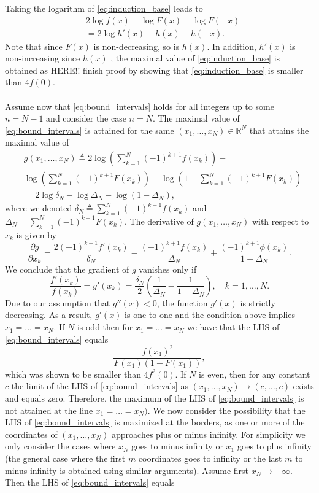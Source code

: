 \documentclass[letterpaper, conference]{IEEEtran}      %
\begin{document}
Taking the logarithm of \eqref{eq:induction_base} leads to 
\begin{align*}
& 2 \log f(x) - \log F(x) - \log F(-x) \\
& = 2 \log h'(x) + h(x) - h(-x).
\end{align*}
Note that since $F(x)$ is non-decreasing, so is $h(x)$. In addition, $h'(x)$ is non-increasing since $h(x)$ 
, the maximal value of \eqref{eq:induction_base} is obtained as 
{HERE!! \color{red} finish proof by showing that \eqref{eq:induction_base} is smaller than $4f(0)$.\\
}
\\
Assume now that \eqref{eq:bound_intervals} holds for all integers up to some $n = N-1$ and consider the case $n = N$. The maximal value of \eqref{eq:bound_intervals} is attained for the same $(x_1,\ldots,x_N) \in \mathbb R^N$ that attains the maximal value of 
\begin{align*}
& g(x_1,\ldots, x_N) \triangleq 2 \log \left(  \sum_{k=1}^{N} (-1)^{k+1} f(x_k) \right) - \\
&  \log
\left( \sum_{k=1}^N (-1)^{k+1} F(x_k) \right)
-\log \left(1 -  \sum_{k=1}^N (-1)^{k+1} F(x_k) \right) \\
& = 2 \log \delta_N - \log \Delta_N - \log \left(1 - \Delta_N  \right),
\end{align*}
where we denoted $\delta_N \triangleq \sum_{k=1}^{N} (-1)^{k+1} f(x_k)$ and $\Delta_N =  \sum_{k=1}^N (-1)^{k+1} F(x_k)$. The derivative of $g(x_1,\ldots,x_N)$ with respect to $x_k$ is given by
\[
\frac{\partial  g}{\partial x_k} = \frac{2 (-1)^{k+1} f'(x_k)}{\delta_N} -\frac{(-1)^{k+1} f(x_k)}{\Delta_N } + \frac{(-1)^{k+1} \phi(x_k)}{1-\Delta_N }.
\]
We conclude that the gradient of $g$ vanishes only if
\[
\frac{f'(x_k)}{f(x_k)} = g'(x_k) = \frac{\delta_N}{2} \left( \frac{1}{\Delta_N} - \frac{1}{1-\Delta_N} \right),\quad k=1,\ldots,N.
\]
Due to our assumption that $g''(x) < 0$, the function $g'(x)$ is strictly decreasing. As a result, $g'(x)$ is one to one and the condition above implies $x_1 = \ldots = x_N$. If $N$ is odd then for $x_1=\ldots =x_N$ we have that the LHS of \eqref{eq:bound_intervals} equals
\[
\frac{f(x_1)^2}{ F(x_1) (1 - F(x_1))},
\]
which was shown to be smaller than $4f^2(0)$. If $N$ is even, then for any constant $c$ the limit of the LHS of \eqref{eq:bound_intervals} as $(x_1,\ldots,x_N)\rightarrow (c,\ldots,c)$ exists and equals zero. Therefore, the maximum of the LHS of \eqref{eq:bound_intervals} is not attained at the line $x_1=\ldots=x_N)$. We now consider the possibility that the LHS of \eqref{eq:bound_intervals} is maximized at the borders, as one or more of the coordinates of $(x_1,\ldots,x_N)$ approaches plus or minus infinity. For simplicity we only consider the cases where $x_N$ goes to minus infinity or $x_1$ goes to plus infinity (the general case where the first $m$ coordinates goes to infinity or the last $m$ to minus infinity is obtained using similar arguments). Assume first $x_N \rightarrow -\infty$. Then the LHS of \eqref{eq:bound_intervals} equals
\end{document}
